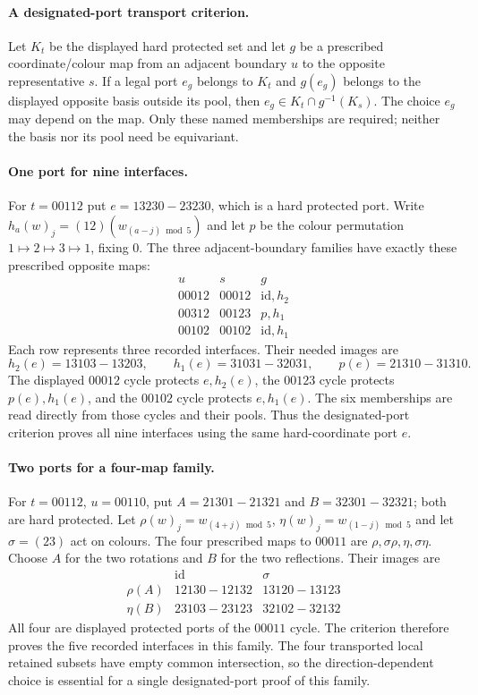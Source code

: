 \paragraph{A designated-port transport criterion.}
Let $K_t$ be the displayed hard protected set and let $g$ be a
prescribed coordinate/colour map from an adjacent boundary $u$ to
the opposite representative $s$. If a legal port $e_g$ belongs to
$K_t$ and $g(e_g)$ belongs to the displayed opposite basis outside
its pool, then $e_g\in K_t\cap g^{-1}(K_s)$.
The choice $e_g$ may depend on the map. Only these named memberships
are required; neither the basis nor its pool need be equivariant.

\paragraph{One port for nine interfaces.}
For $t=00112$ put $e=13230\!-23230$, which is a hard protected port.
Write $h_a(w)_j=(12)(w_{(a-j)\bmod5})$ and let $p$ be the colour
permutation $1\mapsto2\mapsto3\mapsto1$, fixing $0$.
The three adjacent-boundary families have exactly these prescribed
opposite maps:
\[
\begin{array}{c|c|c}
 u& s&g\\\hline
00012&00012&\mathrm{id},h_2\\
00312&00123&p,h_1\\
00102&00102&\mathrm{id},h_1
\end{array}
\]
Each row represents three recorded interfaces. Their needed images are
\[
h_2(e)=13103\!-13203,\qquad
h_1(e)=31031\!-32031,\qquad
p(e)=21310\!-31310.
\]
The displayed $00012$ cycle protects $e,h_2(e)$, the $00123$ cycle
protects $p(e),h_1(e)$, and the $00102$ cycle protects $e,h_1(e)$.
The six memberships are read directly from those cycles and their
pools. Thus the designated-port criterion proves all nine interfaces
using the same hard-coordinate port $e$.

\paragraph{Two ports for a four-map family.}
For $t=00112$, $u=00110$, put
$A=21301\!-21321$ and $B=32301\!-32321$; both are hard protected.
Let $\rho(w)_j=w_{(4+j)\bmod5}$,
$\eta(w)_j=w_{(1-j)\bmod5}$ and let $\sigma=(23)$ act on colours.
The four prescribed maps to $00011$ are
$\rho,\sigma\rho,\eta,\sigma\eta$.
Choose $A$ for the two rotations and $B$ for the two reflections.
Their images are
\[
\begin{array}{c|cc}
 &\mathrm{id}&\sigma\\\hline
\rho(A)&12130\!-12132&13120\!-13123\\
\eta(B)&23103\!-23123&32102\!-32132
\end{array}
\]
All four are displayed protected ports of the $00011$ cycle.
The criterion therefore proves the five recorded interfaces in this
family. The four transported local retained subsets have empty common
intersection, so the direction-dependent choice is essential for a
single designated-port proof of this family.

